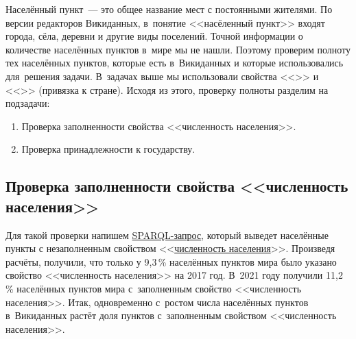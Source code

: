 Населённый пункт~--- это общее название мест с постоянными жителями. %
По версии редакторов Викиданных, в~понятие <<насёленный пункт>> входят города, сёла, деревни 
и другие виды поселений. 
Точной информации о количестве населённых пунктов в~мире мы не нашли. 
Поэтому проверим полноту тех населённых пунктов, которые есть в~Викиданных 
и которые использовались для~решения задачи. 
В~задачах выше мы использовали свойства <<>> и 
<<>> (привязка к стране). 
Исходя из этого, проверку полноты разделим на подзадачи: 
\begin{enumerate} 
  \item Проверка заполненности свойства <<численность населения>>.
  \item Проверка принадлежности к государству.
\end{enumerate}


\subsection{Проверка заполненности свойства <<численность населения>> }

Для такой проверки напишем \href{https://w.wiki/4FUz}{SPARQL-запрос}, 
который выведет населённые пункты 
с незаполненным свойством <<\href{http://www.wikidata.org/entity/P1082}{численность населения}>>. 
Произведя расчёты, получили, что только у 9,3\,\% населённых пунктов мира 
было указано свойство <<численность населения>> на 2017 год. 
В~2021 году получили 11,2\,\% населённых пунктов мира с~заполненным свойство <<численность населения>>. 
Итак, одновременно с~ростом числа населённых пунктов в~Викиданных 
растёт доля пунктов с~заполненным свойством <<численность населения>>.


